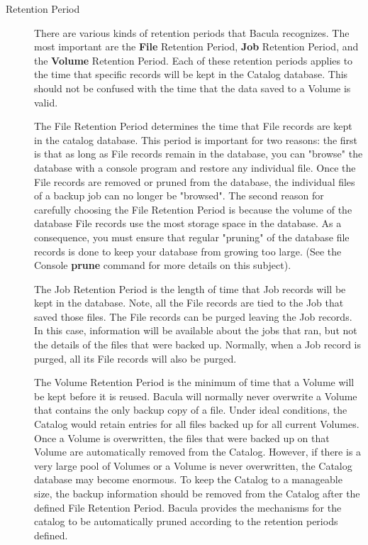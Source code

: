 \begin{description}
\item [Retention Period]
   There are various kinds of retention periods that Bacula recognizes.
   The most important are the {\bf File} Retention Period, {\bf Job}
   Retention Period, and the {\bf Volume} Retention Period.  Each of these
   retention periods applies to the time that specific records will be kept
   in the Catalog database.  This should not be confused with the time that
   the data saved to a Volume is valid.

   The File Retention Period determines the time that File records are kept
   in the catalog database.  This period is important for two reasons: the
   first is that as long as File records remain in the database, you
   can "browse" the database with a console program and restore any
   individual file. Once the File records are removed or pruned from the
   database, the individual files of a backup job can no longer be
   "browsed".  The second reason for carefully choosing the File Retention
   Period is because the volume of
   the database File records use the most storage space in the
   database.  As a consequence, you must ensure that regular "pruning" of
   the database file records is done to keep your database from growing 
   too large. (See the Console {\bf prune}
   command for more details on this subject).

   The Job Retention Period is the length of time that Job records will be
   kept in the database.  Note, all the File records are tied to the Job
   that saved those files.  The File records can be purged leaving the Job
   records.  In this case, information will be available about the jobs
   that ran, but not the details of the files that were backed up.
   Normally, when a Job record is purged, all its File records will also be
   purged.

   The Volume Retention Period is the minimum of time that a Volume will be
   kept before it is reused.  Bacula will normally never overwrite a Volume
   that contains the only backup copy of a file.  Under ideal conditions,
   the Catalog would retain entries for all files backed up for all current
   Volumes.  Once a Volume is overwritten, the files that were backed up on
   that Volume are automatically removed from the Catalog.  However, if
   there is a very large pool of Volumes or a Volume is never overwritten,
   the Catalog database may become enormous.  To keep the Catalog to a
   manageable size, the backup information should be removed from the
   Catalog after the defined File Retention Period.  Bacula provides the
   mechanisms for the catalog to be automatically pruned according to the
   retention periods defined.


\end{description}
